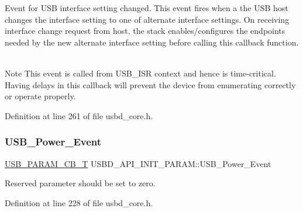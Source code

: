 Event for U\+SB interface setting changed. This event fires when a the U\+SB host changes the interface setting to one of alternate interface settings. On receiving interface change request from host, the stack enables/configures the endpoints needed by the new alternate interface setting before calling this callback function. ~\newline
 \begin{DoxyNote}{Note}
This event is called from U\+S\+B\+\_\+\+I\+SR context and hence is time-\/critical. Having delays in this callback will prevent the device from enumerating correctly or operate properly. 
\end{DoxyNote}


Definition at line 261 of file usbd\+\_\+core.\+h.

\mbox{\label{struct_u_s_b_d___a_p_i___i_n_i_t___p_a_r_a_m_af2aaf61b6e8ada6c2d50b61d516e2db6}} 
\subsubsection{\texorpdfstring{U\+S\+B\+\_\+\+Power\+\_\+\+Event}{USB\_Power\_Event}}
{\footnotesize\ttfamily \hyperlink{group___u_s_b_d___core_ga7df622c61ebb152b83dd5972ac789b28}{U\+S\+B\+\_\+\+P\+A\+R\+A\+M\+\_\+\+C\+B\+\_\+T} U\+S\+B\+D\+\_\+\+A\+P\+I\+\_\+\+I\+N\+I\+T\+\_\+\+P\+A\+R\+A\+M\+::\+U\+S\+B\+\_\+\+Power\+\_\+\+Event}

Reserved parameter should be set to zero. 

Definition at line 228 of file usbd\+\_\+core.\+h.

\mbox{\label{struct_u_s_b_d___a_p_i___i_n_i_t___p_a_r_a_m_a171d80187485a767c4fdf4dc4c4f330a}} 
